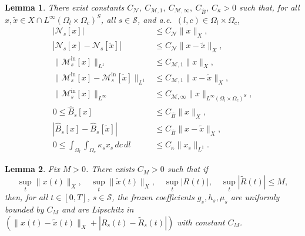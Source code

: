\documentclass[10pt,a4paper]{amsart}
\newtheorem{lemma}{Lemma}
\begin{document}
\begin{lemma}\label{lem:wp_operator_bounds}
There exist constants
\(C_{\mathcal N},\ C_{\mathcal M,1},\ C_{\mathcal M,\infty},\ C_{\widehat B},\ C_\kappa>0\)
such that, for all \(x,\widetilde x\in X\cap L^\infty(\Omega_l\times\Omega_c)^S\),
all \(s\in\mathcal S\), and a.e.\ \((l,c)\in\Omega_l\times\Omega_c\),
\begin{align}
|\mathcal N_s[x]| &\le C_{\mathcal N}\|x\|_X, \label{eq:wp_N_bound}\\
|\mathcal N_s[x]-\mathcal N_s[\widetilde x]|
&\le C_{\mathcal N}\|x-\widetilde x\|_X, \label{eq:wp_N_Lip}\\
\|\mathcal M_s^{\mathrm{in}}[x]\|_{L^1}
&\le C_{\mathcal M,1}\|x\|_X, \label{eq:wp_Min_L1}\\
\|\mathcal M_s^{\mathrm{in}}[x]-\mathcal M_s^{\mathrm{in}}[\widetilde x]\|_{L^1}
&\le C_{\mathcal M,1}\|x-\widetilde x\|_X, \label{eq:wp_Min_L1_Lip}\\
\|\mathcal M_s^{\mathrm{in}}[x]\|_{L^\infty}
&\le C_{\mathcal M,\infty}\|x\|_{L^\infty(\Omega_l\times\Omega_c)^S},
\label{eq:wp_Min_Linfty}\\
0\le \widehat B_s[x] &\le C_{\widehat B}\|x\|_X, \label{eq:wp_Bhat_bound}\\
|\widehat B_s[x]-\widehat B_s[\widetilde x]|
&\le C_{\widehat B}\|x-\widetilde x\|_X, \label{eq:wp_Bhat_Lip}\\
0\le \int_{\Omega_l}\!\int_{\Omega_c}\kappa_s x_s\,dc\,dl
&\le C_\kappa \|x_s\|_{L^1}.
\label{eq:wp_kappa_bound}
\end{align}
\end{lemma}

\begin{lemma}\label{lem:wp_coeff_bounds}
Fix \(M>0\). There exists \(C_M>0\) such that if
\[
\sup_{t}\|x(t)\|_X,\quad\sup_t\|\widetilde x(t)\|_X,\quad\sup_t|R(t)|,\quad\sup_t|\widetilde R(t)|\le M,
\]
then, for all \(t\in[0,T]\), \(s\in\mathcal S\),
the frozen coefficients \(g_s,h_s,\mu_s\) are uniformly bounded by \(C_M\) and are
Lipschitz in \((\|x(t)-\widetilde x(t)\|_X+|R_s(t)-\widetilde R_s(t)|)\) with constant
\(C_M\).
\end{lemma}
\end{document}
